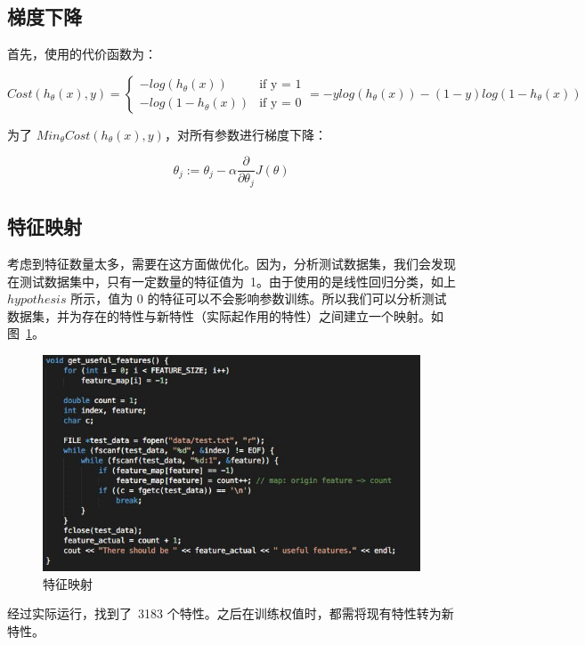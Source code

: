 \documentclass[hyperref, UTF8]{ctexart}
\begin{document}
\subsection{梯度下降}

首先，使用的代价函数为：

\begin{equation*}
Cost(h_{\theta}(x), y) = 
\begin{cases}
-log(h_{\theta}(x)) & \text{if y = 1} \\
-log(1 - h_{\theta}(x)) & \text{if y = 0}
\end{cases}
= -ylog(h_{\theta}(x)) - (1-y)log(1 - h_{\theta}(x))
\end{equation*}

为了 $Min_{\theta}Cost(h_{\theta}(x), y)$，对所有参数进行梯度下降：

$$ \theta_j := \theta_j - \alpha\frac{\partial}{\partial\theta_j}J(\theta) $$

\subsection{特征映射}

考虑到特征数量太多，需要在这方面做优化。因为，分析测试数据集，我们会发现在测试数据集中，只有一定数量的特征值为\ 1。由于使用的是线性回归分类，如上 $hypothesis$ 所示，值为 0 的特征可以不会影响参数训练。所以我们可以分析测试数据集，并为存在的特性与新特性（实际起作用的特性）之间建立一个映射。如图~\ref{code:preprocess}。

\begin{figure}[H]
	\centering
	\includegraphics[width=384pt]{../results/code-preprocess.jpg}
	\caption{特征映射}
	\label{code:preprocess}
\end{figure}

经过实际运行，找到了\ 3183 个特性。之后在训练权值时，都需将现有特性转为新特性。
\end{document}
